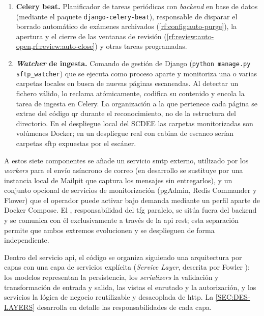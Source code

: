 \begin{enumerate}
  \item \textbf{Celery beat.}
  Planificador de tareas periódicas con \textit{backend} en base de
  datos (mediante el paquete \texttt{django-celery-beat}), responsable
  de disparar el borrado automático de exámenes archivados
  (\cref{rf:config:auto-purge}), la apertura y el cierre de las ventanas
  de revisión (\cref{rf:review:auto-open,rf:review:auto-close}) y otras
  tareas programadas.

  \item \textbf{\textit{Watcher} de ingesta.}
  Comando de gestión de Django (\texttt{python manage.py sftp\_watcher})
  que se ejecuta como proceso aparte y monitoriza una o varias carpetas
  locales en busca de nuevas páginas escaneadas. Al detectar un fichero
  válido, lo reclama atómicamente, codifica su contenido y encola la
  tarea de ingesta en Celery. La organización a la que pertenece cada
  página se extrae del código \acs{qr} durante el reconocimiento, no
  de la estructura del directorio. En el despliegue local del SCDEE las
  carpetas monitorizadas son volúmenes Docker; en un despliegue real
  con cabina de escaneo serían carpetas \acs{sftp} expuestas por el
  escáner.

\end{enumerate}

A estos siete componentes se añade un servicio \acs{smtp} externo, utilizado
por los \textit{workers} para el envío asíncrono de correo (en desarrollo
se sustituye por una instancia local de Mailpit que captura los mensajes
sin entregarlos), y un conjunto opcional de servicios de monitorización
(pgAdmin, Redis Commander y Flower) que el operador puede activar bajo
demanda mediante un perfil aparte de Docker Compose. El ,
responsabilidad del \acs{tfg} paralelo, se sitúa fuera del backend y se
comunica con él exclusivamente a través de la \acs{api} \acs{rest}; esta
separación permite que ambos extremos evolucionen y se desplieguen de forma
independiente.

Dentro del servicio \acs{api}, el código se organiza siguiendo una
arquitectura por capas con una capa de servicios explícita
(\textit{Service Layer}, descrita por Fowler \cite{fowler2002}): los
modelos representan la persistencia, los \textit{serializers} la validación
y transformación de entrada y salida, las vistas el enrutado y la
autorización, y los servicios la lógica de negocio reutilizable y
desacoplada de \acs{http}. La \cref{SEC:DES-LAYERS} desarrolla en detalle
las responsabilidades de cada capa.
